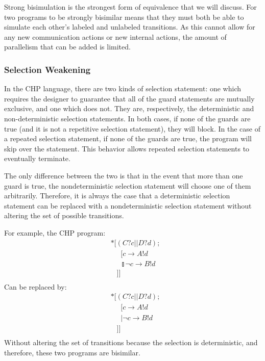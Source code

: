\documentclass[times, 10pt]{article}
\begin{document}
Strong bisimulation is the strongest form of equivalence that we will discuss.
For two programs to be strongly bisimilar means that they must both be able to
simulate each other's labeled and unlabeled transitions. As this cannot allow
for any new communication actions or new internal actions, the amount of
parallelism that can be added is limited.

\subsubsection{Selection Weakening}

In the CHP language, there are two kinds of selection statement: one which
requires the designer to guarantee that all of the guard statements are
mutually exclusive, and one which does not. They are, respectively, the
deterministic and non-deterministic selection statements. In both cases, if
none of the guards are true (and it is not a repetitive selection statement),
they will block. In the case of a repeated selection statement, if none of the
guards are true, the program will skip over the statement. This behavior
allows repeated selection statements to eventually terminate.

The only difference between the two is that in the event that more than one
guard is true, the nondeterministic selection statement will choose one of them
arbitrarily.  Therefore, it is always the case that a deterministic selection
statement can be replaced with a nondeterministic selection statement without
altering the set of possible transitions.

For example, the CHP program:
\begin{align*}
&*[(C?c || D?d); \\
& \;\;\;\;\;[ c \rightarrow A!d \\
& \;\;\;\;\;\talloblong \lnot c \rightarrow B!d \\
& \;\;\;]] \\
\end{align*}
Can be replaced by:
\begin{align*}
&*[(C?c || D?d); \\
& \;\;\;\;\;[ c \rightarrow A!d \\
& \;\;\;\;\;| \lnot c \rightarrow B!d \\
& \;\;\;]] \\
\end{align*}
Without altering the set of transitions because the selection is deterministic,
and therefore, these two programs are bisimilar.
\end{document}
